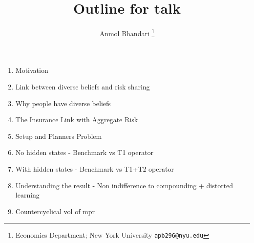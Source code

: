 \documentclass[12pt]{article}
\begin{document}
\title{Outline for talk}
\author{Anmol Bhandari \thanks{Economics Department; New York University \texttt{apb296@nyu.edu}}}
\maketitle
\begin{enumerate}
	\item Motivation 
	\item Link between diverse beliefs and risk sharing
	\item Why people have diverse beliefs
	\item The Insurance Link with Aggregate Risk
	\item Setup and Planners Problem
	\item No hidden states - Benchmark vs T1 operator 
	\item With hidden states - Benchmark vs T1+T2 operator
	\item Understanding the result - Non indifference to compounding + distorted learning
	\item Countercyclical vol of mpr
\end{enumerate}
\end{document}
